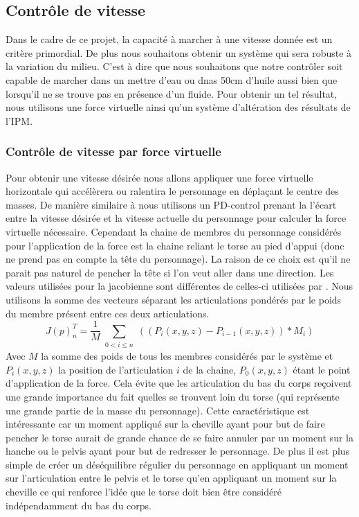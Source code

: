 \documentclass{llncs}
\begin{document}
%
\subsection{Contrôle de vitesse}
%
\label{sec:speed_control}
Dans le cadre de ce projet, la capacité à marcher à une vitesse donnée est un critère primordial. De plus nous souhaitons obtenir un système qui sera robuste à la variation du milieu. C'est à dire que nous souhaitons que notre contrôler soit capable de marcher dans un mettre d'eau ou dnas 50cm d'huile aussi bien que lorsqu'il ne se trouve pas en présence d'un fluide. Pour obtenir un tel résultat, nous utilisons une force virtuelle ainsi qu'un système d'altération des résultats de l'IPM.
%
\subsubsection{Contrôle de vitesse par force virtuelle}
%
\label{sec:speed_virt_force}

Pour obtenir une vitesse désirée nous allons appliquer une force virtuelle horizontale qui accélèrera ou ralentira le personnage en déplaçant le centre des masses. De manière similaire à \cite{coros2010generalized} nous utilisons un PD-control prenant la l'écart entre la vitesse désirée et la vitesse actuelle du personnage pour calculer la force virtuelle nécessaire.
Cependant la chaine de membres du personnage considérés pour l'application de la force est la chaine reliant le torse au pied d'appui (donc ne prend pas en compte la tête du personnage). La raison de ce choix est qu'il ne parait pas naturel de pencher la tête si l'on veut aller dans une direction. Les valeurs utilisées pour la jacobienne sont différentes de celles-ci utilisées par \cite{coros2010generalized}. Nous utilisons la somme des vecteurs séparant les articulations pondérés par le poids du membre présent entre ces deux articulations.
\[
J(p) _n ^T =\frac{1}{M}\sum_{\substack{0<i\leq n}} ((P_i(x,y,z)-P_{i-1}(x,y,z))*M_i)
\]
Avec \(M\) la somme des poids de tous les membres considérés par le système et \(P_i(x,y,z)\) la position de l'articulation \(i\) de la chaine, \(P_0(x,y,z)\) étant le point d'application de la force. Cela évite que les articulation du bas du corps reçoivent une grande importance du fait quelles se trouvent loin du torse (qui représente une grande partie de la masse du personnage). Cette caractéristique est intéressante car un moment appliqué sur la cheville ayant pour but de faire pencher le torse aurait de grande chance de se faire annuler par un moment sur la hanche ou le pelvis ayant pour but de redresser le personnage. De plus il est plus simple de créer un déséquilibre régulier du personnage en appliquant un moment sur l'articulation entre le pelvis et le torse qu'en appliquant un moment sur la cheville ce qui renforce l'idée que le torse doit bien être considéré indépendamment du bas du corps.
\end{document}
